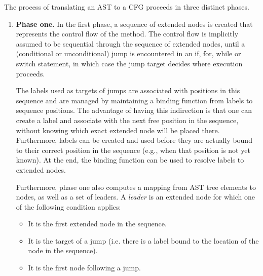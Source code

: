 The process of translating an AST to a CFG proceeds in three distinct phases.
\begin{enumerate}
    \item \textbf{Phase one.} In the first phase, a sequence of extended nodes is created
    that represents the control flow of the method. The control flow is implicitly
    assumed to be sequential through the sequence of extended nodes, until a (conditional
    or unconditional) jump is encountered in an if, for, while or switch statement, in which
    case the jump target decides where execution proceeds.
    
    The labels used as targets of jumps are associated with positions in this sequence and are managed
    by maintaining a binding function from labels to sequence positions. The advantage of
    having this indirection is that one can create a label and associate with the next free
    position in the sequence, without knowing which exact extended node will be placed there.
    Furthermore, labels can be created and used before they are actually bound to their correct
    position in the sequence (e.g., when that position is not yet known).
    At the end, the binding function can be used to resolve labels to
    extended nodes.
    
    Furthermore, phase one also computes a mapping from AST tree elements to nodes, as well
    as a set of leaders. A \emph{leader} is an extended node for which one of the following
    condition applies:
    \begin{itemize}
    \item It is the first extended node in the sequence.
    \item It is the target of a jump (i.e. there is a label bound to the location of the node
    in the sequence).
    \item It is the first node following a jump.
    \end{itemize}
    

\end{enumerate}
